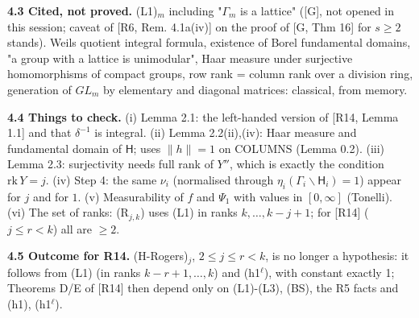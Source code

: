 \textbf{4.3 Cited, not proved.} (L1)\(_m\) including "\(\Gamma_m\) is a lattice" ({[}G{]}, not opened in this session; caveat of {[}R6, Rem. 4.1a(iv){]} on the proof of {[}G, Thm 16{]} for \(s\ge2\) stands). Weil\textquotesingle s quotient integral formula, existence of Borel fundamental domains, "a group with a lattice is unimodular", Haar measure under surjective homomorphisms of compact groups, row rank = column rank over a division ring, generation of \(GL_m\) by elementary and diagonal matrices: classical, from memory.

\textbf{4.4 Things to check.} (i) Lemma 2.1: the left-handed version of {[}R14, Lemma 1.1{]} and that \(\delta^{-1}\) is integral. (ii) Lemma 2.2(ii),(iv): Haar measure and fundamental domain of \(\mathsf H\); uses \(\|h\|=1\) on COLUMNS (Lemma 0.2). (iii) Lemma 2.3: surjectivity needs full rank of \(Y''\), which is exactly the condition \(\mathrm{rk}\,Y=j\). (iv) Step 4: the same \(\nu_i\) (normalised through \(\eta_i(\Gamma_i\backslash\mathsf H_i)=1\)) appear for \(j\) and for \(1\). (v) Measurability of \(f\) and \(\Psi_1\) with values in \([0,\infty]\) (Tonelli). (vi) The set of ranks: (R\(_{j,k}\)) uses (L1) in ranks \(k,\dots,k-j+1\); for {[}R14{]} (\(j\le r<k\)) all are \(\ge2\).

\textbf{4.5 Outcome for R14.} (H-Rogers)\(_j\), \(2\le j\le r<k\), is no longer a hypothesis: it follows from (L1) (in ranks \(k-r+1,\dots,k\)) and (h1\(^\ell\)), with constant exactly 1; Theorems D/E of {[}R14{]} then depend only on (L1)-(L3), (BS), the R5 facts and (h1), (h1\(^\ell\)).
